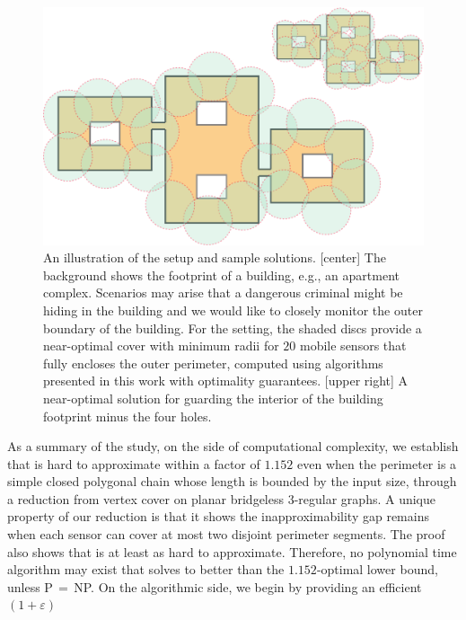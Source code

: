 \begin{figure}[ht]
    \centering
		\vspace*{2mm}
    \includegraphics[width=\columnwidth]{chapters/osg/figures/example-0-eps-converted-to.pdf}
		\vspace*{1mm}
    \caption[An illustration of the \osgt setup and sample solutions]
		{An illustration of the \osgt setup and sample solutions.
		[center] The background shows the footprint of a building, e.g., an 
		apartment  complex. Scenarios may arise that a dangerous criminal 
		might be hiding in the building and we would like to closely monitor 
		the outer boundary of the building.	For the setting, the shaded 
		discs provide a	near-optimal cover with minimum radii for $20$ 
		mobile sensors that fully encloses the outer perimeter, computed 
		using algorithms presented in this work with optimality guarantees. 
		[upper right] A near-optimal solution for guarding the interior of
		the building footprint minus the four holes.}
    \label{fig:example0}
\end{figure}
As a summary of the study, on the side of computational complexity, we 
establish that \opgt is hard to approximate within a factor of 
$1.152$
even when the perimeter is a simple closed polygonal chain whose length
is bounded by the input size, through a reduction from 
vertex cover on planar bridgeless $3$-regular graphs.
%
A unique property of our reduction is that it shows the inapproximability gap
remains when each sensor can cover at most two disjoint perimeter 
segments. 
%
The proof also shows that \orgt is at least as hard to approximate. 
Therefore, no polynomial time algorithm may exist that solves \osgt to 
better than the $1.152$-optimal lower bound, unless P$\,=\,$NP. 
%
On the algorithmic side, we begin by providing an efficient $(1+\varepsilon)$
